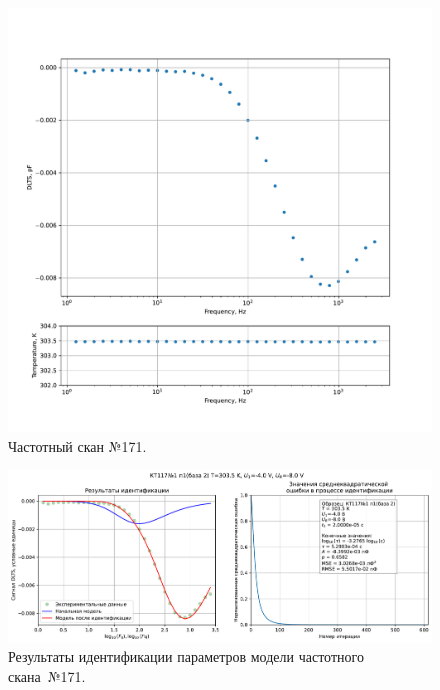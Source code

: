 \begin{figure}[!ht]
    \centering
    \includegraphics[width=1\textwidth]{../plots/КТ117№1_п1(база 2)_2500Гц-1Гц_1пФ_+30С_-4В-8В_100мВ_20мкс_шаг_0,1.pdf}
    \caption{Частотный скан №171.}
    \label{pic:frequency_scan_171}
\end{figure}

\begin{figure}[!ht]
    \centering
    \includegraphics[width=1\textwidth]{../plots/КТ117№1_п1(база 2)_2500Гц-1Гц_1пФ_+30С_-4В-8В_100мВ_20мкс_шаг_0,1_model.pdf}
    \caption{Результаты идентификации параметров модели частотного скана~№171.}
    \label{pic:frequency_scan_model171}
\end{figure}

\pagebreak


